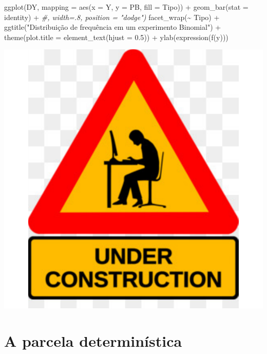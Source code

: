 \documentclass[
]{book}
\newenvironment{Shaded}{\begin{snugshade}}{\end{snugshade}}
\newcommand{\AttributeTok}[1]{\textcolor[rgb]{0.77,0.63,0.00}{#1}}
\newcommand{\CommentTok}[1]{\textcolor[rgb]{0.56,0.35,0.01}{\textit{#1}}}
\newcommand{\FloatTok}[1]{\textcolor[rgb]{0.00,0.00,0.81}{#1}}
\newcommand{\FunctionTok}[1]{\textcolor[rgb]{0.00,0.00,0.00}{#1}}
\newcommand{\NormalTok}[1]{#1}
\newcommand{\SpecialCharTok}[1]{\textcolor[rgb]{0.00,0.00,0.00}{#1}}
\newcommand{\StringTok}[1]{\textcolor[rgb]{0.31,0.60,0.02}{#1}}
\begin{document}
\begin{Shaded}
\begin{Highlighting}[]
\FunctionTok{ggplot}\NormalTok{(DY, }\AttributeTok{mapping =} \FunctionTok{aes}\NormalTok{(}\AttributeTok{x =}\NormalTok{ Y, }\AttributeTok{y =}\NormalTok{ PB, }\AttributeTok{fill =}\NormalTok{ Tipo)) }\SpecialCharTok{+}
  \FunctionTok{geom\_bar}\NormalTok{(}\AttributeTok{stat =} \StringTok{\textquotesingle{}identity\textquotesingle{}}\NormalTok{) }\SpecialCharTok{+} \CommentTok{\#, width=.8, position = "dodge")}
  \FunctionTok{facet\_wrap}\NormalTok{(}\SpecialCharTok{\textasciitilde{}}\NormalTok{ Tipo) }\SpecialCharTok{+}
  \FunctionTok{ggtitle}\NormalTok{(}\StringTok{"Distribuição de frequência em um experimento Binomial"}\NormalTok{) }\SpecialCharTok{+} 
  \FunctionTok{theme}\NormalTok{(}\AttributeTok{plot.title =} \FunctionTok{element\_text}\NormalTok{(}\AttributeTok{hjust =} \FloatTok{0.5}\NormalTok{)) }\SpecialCharTok{+}
  \FunctionTok{ylab}\NormalTok{(}\FunctionTok{expression}\NormalTok{(}\FunctionTok{f}\NormalTok{(y)))}
\end{Highlighting}
\end{Shaded}

\begin{center}\includegraphics{probest-cambientais_files/figure-latex/unnamed-chunk-237-1} \end{center}

\hypertarget{a-parcela-determinuxedstica}{%
\section{A parcela determinística}\label{a-parcela-determinuxedstica}}
\end{document}
